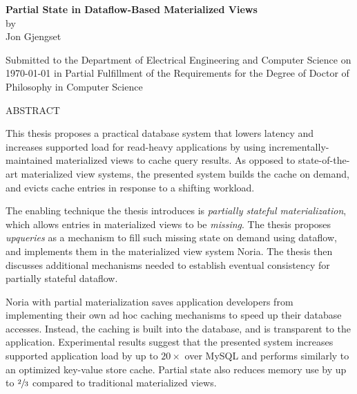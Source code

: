 \documentclass[fontsize=12pt,paper=letter]{scrartcl}
\begin{document}
\begin{titlepage}
  \begin{center}
    \textbf{\large Partial State in Dataflow-Based Materialized Views}\\
    \vspace{0.5\baselineskip}
    by\\
    \vspace{0.5\baselineskip}
    {\large Jon Gjengset}\\
    \vspace{0.5\baselineskip}
    \begin{addmargin}[0.15in]{0.15in}
      \centering
    Submitted to the Department of
    Electrical Engineering and Computer Science
    on \today{}
    in Partial Fulfillment of the Requirements for the Degree of
    Doctor of Philosophy in Computer Science
    \end{addmargin}
  \end{center}

  \begin{flushleft}
  ABSTRACT
  \vspace{0.5\baselineskip}

  This thesis proposes a practical database system that lowers latency and
    increases supported load for read-heavy applications by using
    incrementally-maintained materialized views to cache query results. As
    opposed to state-of-the-art materialized view systems, the presented system
    builds the cache on demand, and evicts cache entries in response to a
    shifting workload.

  \vspace{0.5\baselineskip}

  The enabling technique the thesis introduces is \textit{partially stateful
    materialization}, which allows entries in materialized views to be
    \textit{missing}. The thesis proposes \textit{upqueries} as a mechanism to
    fill such missing state on demand using dataflow, and implements them in the
    materialized view system Noria. The thesis then discusses additional
    mechanisms needed to establish eventual consistency for partially stateful
    dataflow.

  \vspace{0.5\baselineskip}

  Noria with partial materialization saves application developers from
    implementing their own ad hoc caching mechanisms to speed up their database
    accesses. Instead, the caching is built into the database, and is
    transparent to the application. Experimental results suggest that the
    presented system increases supported application load by up to $20\times$
    over MySQL and performs similarly to an optimized key-value store cache.
    Partial state also reduces memory use by up to $\sfrac{2}{3}$ compared to
    traditional materialized views.


\end{flushleft}
\end{titlepage}
\end{document}
